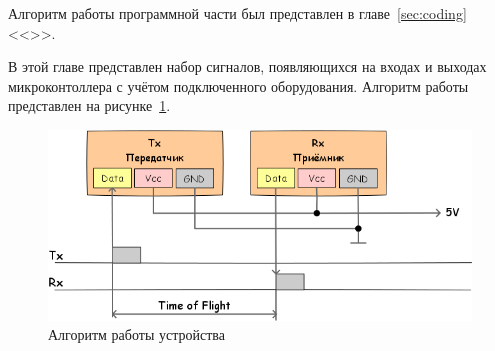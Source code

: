 Алгоритм работы программной части был представлен в главе~\ref{sec:coding} <<>>.

В этой главе представлен набор сигналов, появляющихся на входах и выходах микроконтоллера с учётом подключенного оборудования. Алгоритм работы представлен на рисунке~\ref{fig:physalg}.

\begin{figure}[ht]
    \includegraphics[width=.8\linewidth]{Figures/physalg.png}
    \caption{Алгоритм работы устройства}
    \label{fig:physalg}
\end{figure}
